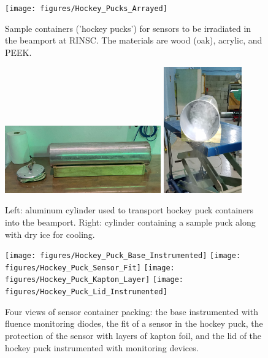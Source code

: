 \begin{figure}[!hbt]
  \begin{center}
    \texttt{[image: figures/Hockey\_Pucks\_Arrayed]}
    \caption{Sample containers ('hockey pucks') for sensors to be irradiated in the beamport at RINSC. The materials are wood (oak), acrylic, and PEEK.}
    \label{fig:Pucks_Arrayed}
  \end{center}
\end{figure}

\begin{figure}[!hbt]
  \begin{center}
    \includegraphics[width=0.60\textwidth]{figures/Cylinder_Side_View}
    \includegraphics[width=0.30\textwidth]{figures/Cylinder_With_Dry_Ice}
    \caption{Left: aluminum cylinder used to transport hockey puck containers into the beamport. Right: cylinder containing a sample puck along with dry ice for cooling.}
    \label{fig:Cylinder_Details}
  \end{center}
\end{figure}

\begin{figure}[!hbt]
  \begin{center}
    \texttt{[image: figures/Hockey\_Puck\_Base\_Instrumented]}  
    \texttt{[image: figures/Hockey\_Puck\_Sensor\_Fit]}
    \texttt{[image: figures/Hockey\_Puck\_Kapton\_Layer]}
    \texttt{[image: figures/Hockey\_Puck\_Lid\_Instrumented]}    
    \caption{Four views of sensor container packing: the base instrumented with fluence monitoring diodes, the fit of a sensor in the hockey puck, the protection of the sensor with layers of kapton foil, and the lid of the hockey puck instrumented with monitoring devices.}
    \label{fig:Puck_Packing}
  \end{center}
\end{figure}

